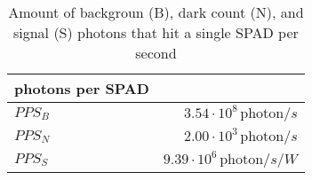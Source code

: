 \begin{table}[H]
\centering
\caption{Amount of backgroun (B), dark count (N), and signal (S) photons that hit a single SPAD per second}
\label{tab:photons_per_SPAD}
\begin{tabular}{|l|r|}\hline
    \textbf{photons per SPAD} & \\
    \hline 
    $PPS_B$ & $3.54\cdot10^{8}\, \text{photon}/s$ \\
    $PPS_N$ & $2.00\cdot10^{3}\, \text{photon}/s$ \\
    $PPS_S$ & $9.39\cdot10^{6}\, \text{photon}/s/W$ \\
    \hline 
\end{tabular}
\end{table}
